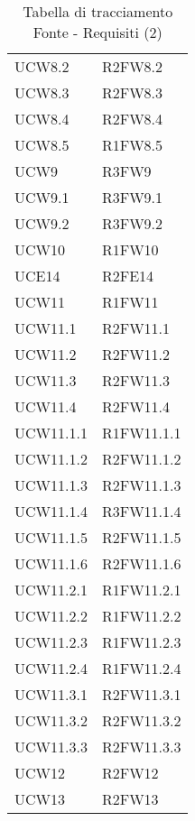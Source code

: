 \begin{table}[H]
\begin{tabular}[t]{ m{}<{\centering}  m{}<{\centering} }
	UCW8.2 & R2FW8.2 \\	
	 
	UCW8.3 & R2FW8.3\\	
	 
	UCW8.4 & R2FW8.4 \\	 
	 
	UCW8.5 & R1FW8.5 \\	 
	 
	UCW9 & R3FW9 \\	
	 
	UCW9.1 & R3FW9.1\\	 
	 
	UCW9.2 & R3FW9.2\\	  
	 
	UCW10 & R1FW10 \\	 
	 
	UCE14 & R2FE14\\	 
	 	 
	UCW11 & R1FW11\\	 	
	
 	UCW11.1 & R2FW11.1 \\
 	
 	UCW11.2 & R2FW11.2 \\
 	
	UCW11.3 & R2FW11.3 \\
 
	UCW11.4 & R2FW11.4 \\
	
	UCW11.1.1 & R1FW11.1.1 \\
		
	UCW11.1.2 & R2FW11.1.2 \\
		
	UCW11.1.3 & R2FW11.1.3 \\
	
	UCW11.1.4 & R3FW11.1.4\\
	
	UCW11.1.5 & R2FW11.1.5\\
	
	UCW11.1.6 & R2FW11.1.6 \\
	
	UCW11.2.1 & R1FW11.2.1 \\

	UCW11.2.2 & R1FW11.2.2 \\	
	
	UCW11.2.3 & R1FW11.2.3 \\
	
	UCW11.2.4 & R1FW11.2.4 \\
	
	UCW11.3.1 & R2FW11.3.1 \\
	
	UCW11.3.2 & R2FW11.3.2 \\
	
	UCW11.3.3 & R2FW11.3.3 \\

	UCW12 & R2FW12\\

	UCW13 & R2FW13 \\

\end{tabular}
\caption{Tabella di tracciamento Fonte - Requisiti (2)}
\end{table}

